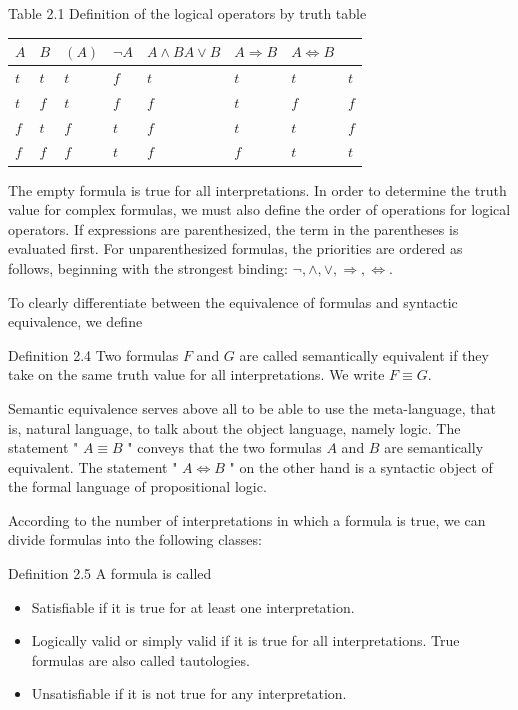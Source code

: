 \documentclass[10pt]{book}
\begin{document}
Table 2.1 Definition of the logical operators by truth table


\begin{center}
\begin{tabular}{llllllll}
\hline
$A$ & $B$ & $(A)$ & $\neg A$ & $A \wedge B A \vee B$ & $A \Rightarrow B$ & $A \Leftrightarrow B$ &  \\
\hline
$t$ & $t$ & $t$ & $f$ & $t$ & $t$ & $t$ & $t$ \\
\hline
$t$ & $f$ & $t$ & $f$ & $f$ & $t$ & $f$ & $f$ \\
\hline
$f$ & $t$ & $f$ & $t$ & $f$ & $t$ & $t$ & $f$ \\
\hline
$f$ & $f$ & $f$ & $t$ & $f$ & $f$ & $t$ & $t$ \\
\hline
\end{tabular}
\end{center}

The empty formula is true for all interpretations. In order to determine the truth value for complex formulas, we must also define the order of operations for logical operators. If expressions are parenthesized, the term in the parentheses is evaluated first. For unparenthesized formulas, the priorities are ordered as follows, beginning with the strongest binding: $\neg, \wedge, \vee, \Rightarrow, \Leftrightarrow$.

To clearly differentiate between the equivalence of formulas and syntactic equivalence, we define

Definition 2.4 Two formulas $F$ and $G$ are called semantically equivalent if they take on the same truth value for all interpretations. We write $F \equiv G$.

Semantic equivalence serves above all to be able to use the meta-language, that is, natural language, to talk about the object language, namely logic. The statement " $A \equiv B$ " conveys that the two formulas $A$ and $B$ are semantically equivalent. The statement " $A \Leftrightarrow B$ " on the other hand is a syntactic object of the formal language of propositional logic.

According to the number of interpretations in which a formula is true, we can divide formulas into the following classes:

Definition 2.5 A formula is called

\begin{itemize}
  \item Satisfiable if it is true for at least one interpretation.
  \item Logically valid or simply valid if it is true for all interpretations. True formulas are also called tautologies.
  \item Unsatisfiable if it is not true for any interpretation.
\end{itemize}
\end{document}

